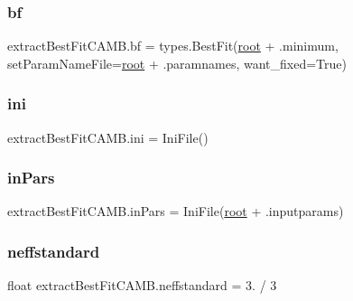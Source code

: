 \subsubsection{\texorpdfstring{bf}{bf}}
{\footnotesize\ttfamily extract\+Best\+Fit\+C\+A\+M\+B.\+bf = types.\+Best\+Fit(\mbox{\hyperlink{namespaceextractBestFitCAMB_a92ac932489427bc065e81b7429fcc584}{root}} + \textquotesingle{}.minimum\textquotesingle{}, set\+Param\+Name\+File=\mbox{\hyperlink{namespaceextractBestFitCAMB_a92ac932489427bc065e81b7429fcc584}{root}} + \textquotesingle{}.paramnames\textquotesingle{}, want\+\_\+fixed=True)}

\mbox{\label{namespaceextractBestFitCAMB_ae8ff10349285b6fc035b5d08319593aa}} 
\subsubsection{\texorpdfstring{ini}{ini}}
{\footnotesize\ttfamily extract\+Best\+Fit\+C\+A\+M\+B.\+ini = Ini\+File()}

\mbox{\label{namespaceextractBestFitCAMB_af20363a89ff706a1c9fbd382dfbeb90a}} 
\subsubsection{\texorpdfstring{in\+Pars}{inPars}}
{\footnotesize\ttfamily extract\+Best\+Fit\+C\+A\+M\+B.\+in\+Pars = Ini\+File(\mbox{\hyperlink{namespaceextractBestFitCAMB_a92ac932489427bc065e81b7429fcc584}{root}} + \textquotesingle{}.inputparams\textquotesingle{})}

\mbox{\label{namespaceextractBestFitCAMB_af81cedf8e7971cd99cfb81f897d2dfec}} 
\subsubsection{\texorpdfstring{neffstandard}{neffstandard}}
{\footnotesize\ttfamily float extract\+Best\+Fit\+C\+A\+M\+B.\+neffstandard = 3. / 3}

